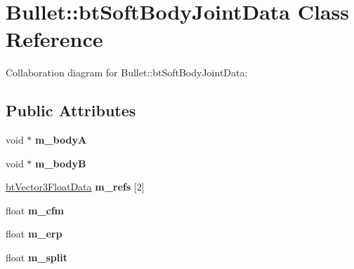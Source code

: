\hypertarget{class_bullet_1_1bt_soft_body_joint_data}{\section{Bullet\+:\+:bt\+Soft\+Body\+Joint\+Data Class Reference}
\label{class_bullet_1_1bt_soft_body_joint_data}
}


Collaboration diagram for Bullet\+:\+:bt\+Soft\+Body\+Joint\+Data\+:
\subsection*{Public Attributes}
\begin{DoxyCompactItemize}
\item 
\hypertarget{class_bullet_1_1bt_soft_body_joint_data_a38d1bfa8bfa4402f5c03c6fd6bfb3d7e}{void $\ast$ {\bfseries m\+\_\+body\+A}}\label{class_bullet_1_1bt_soft_body_joint_data_a38d1bfa8bfa4402f5c03c6fd6bfb3d7e}

\item 
\hypertarget{class_bullet_1_1bt_soft_body_joint_data_a7967bbac59ccfc381547e1c4494c1f17}{void $\ast$ {\bfseries m\+\_\+body\+B}}\label{class_bullet_1_1bt_soft_body_joint_data_a7967bbac59ccfc381547e1c4494c1f17}

\item 
\hypertarget{class_bullet_1_1bt_soft_body_joint_data_a770b93aafce81da2f98150165e3eb600}{\hyperlink{class_bullet_1_1bt_vector3_float_data}{bt\+Vector3\+Float\+Data} {\bfseries m\+\_\+refs} \mbox{[}2\mbox{]}}\label{class_bullet_1_1bt_soft_body_joint_data_a770b93aafce81da2f98150165e3eb600}

\item 
\hypertarget{class_bullet_1_1bt_soft_body_joint_data_a66a95e1867d124f60a7bbbd9c3e5a989}{float {\bfseries m\+\_\+cfm}}\label{class_bullet_1_1bt_soft_body_joint_data_a66a95e1867d124f60a7bbbd9c3e5a989}

\item 
\hypertarget{class_bullet_1_1bt_soft_body_joint_data_a44b26533054e0ff6d08ad341680e257e}{float {\bfseries m\+\_\+erp}}\label{class_bullet_1_1bt_soft_body_joint_data_a44b26533054e0ff6d08ad341680e257e}

\item 
\hypertarget{class_bullet_1_1bt_soft_body_joint_data_a8add2f5a2dbf802037fa842b2c4b7fa6}{float {\bfseries m\+\_\+split}}\label{class_bullet_1_1bt_soft_body_joint_data_a8add2f5a2dbf802037fa842b2c4b7fa6}


\end{DoxyCompactItemize}
